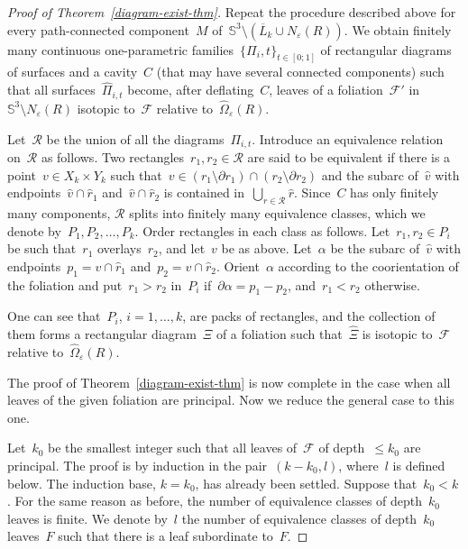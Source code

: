 \documentclass{amsart}
\theoremstyle{theorem}
\theoremstyle{remark}
\theoremstyle{definition}
\numberwithin{equation}{section}
\numberwithin{figure}{section}
\begin{document}
\begin{proof}[Proof of Theorem~\ref{diagram-exist-thm}]
Repeat the procedure described above for every path-connected component~$M$ of~$\mathbb S^3\setminus(\overline L_k\cup N_\varepsilon(R))$.
We obtain finitely many continuous one-parametric families~$\{\Pi_i,t\}_{t\in[0;1]}$ of rectangular diagrams of surfaces and a cavity~$C$ (that
may have several connected components) such that all surfaces~$\widehat\Pi_{i,t}$ become, after deflating~$C$, leaves
of a foliation~$\mathscr F'$ in~$\mathbb S^3\setminus N_\varepsilon(R)$ isotopic to~$\mathscr F$ relative to~$\widehat\Omega_\varepsilon(R)$.

Let~$\mathscr R$ be the union of all the diagrams~$\Pi_{i,t}$. Introduce an equivalence relation on~$\mathscr R$
as follows. Two rectangles~$r_1,r_2\in\mathscr R$ are said to be equivalent if there is a point~$v\in X_k\times Y_k$
such that~$v\in (r_1\setminus\partial r_1)\cap(r_2\setminus\partial r_2)$ and the subarc of~$\widehat v$ with endpoints~$\widehat v\cap\widehat r_1$ and~$\widehat v\cap\widehat r_2$
is contained in~$\bigcup_{r\in\mathscr R}\widehat r$. Since~$C$ has only finitely many components, $\mathscr R$
splits into finitely many equivalence classes, which we denote by~$P_1,P_2,\ldots,P_k$. Order rectangles
in each class as follows. Let~$r_1,r_2\in P_i$
be such that~$r_1$ overlays~$r_2$, and let~$v$ be as above. Let~$\alpha$ be the subarc of~$\widehat v$
with endpoints~$p_1=\widehat v\cap\widehat r_1$ and~$p_2=\widehat v\cap\widehat r_2$. Orient~$\alpha$
according to the coorientation of the foliation and put~$r_1>r_2$ in~$P_i$ if~$\partial\alpha=p_1-p_2$,
and~$r_1<r_2$ otherwise.


One can see that~$P_i$, $i=1,\ldots,k$, are packs of rectangles, and the collection of them forms
a rectangular diagram~$\Xi$ of a foliation such that~$\widehat\Xi$ is isotopic to~$\mathscr F$
relative to~$\widehat\Omega_\varepsilon(R)$.

The proof of Theorem~\ref{diagram-exist-thm} is now complete in the case when all leaves of the given
foliation are principal. Now we reduce the general case to this one.

Let~$k_0$ be the smallest integer such that all leaves of~$\mathscr F$ of depth~$\leqslant k_0$ are principal. The proof
is by induction in the pair~$(k-k_0,l)$, where~$l$ is defined below.
The induction base, $k=k_0$, has already been settled. Suppose that~$k_0<k$. For the same
reason as before, the number of equivalence classes of depth~$k_0$ leaves is finite. We denote by~$l$
the number of equivalence classes of depth~$k_0$ leaves~$F$ such that there is a leaf subordinate to~$F$.


\end{proof}
\end{document}
